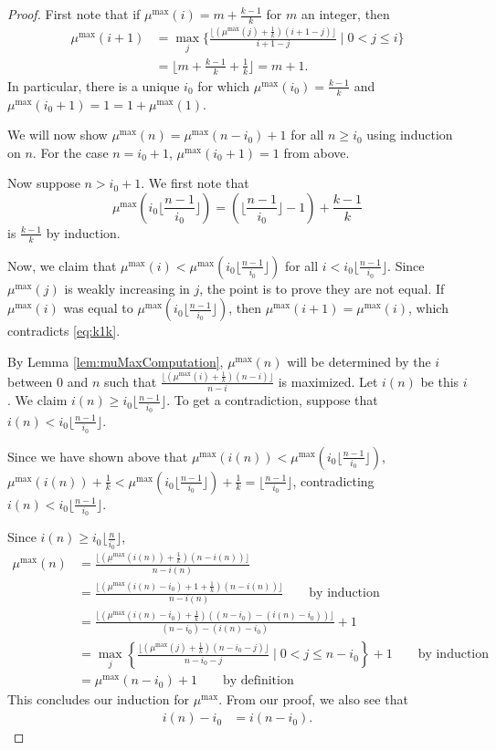 \documentclass[11pt,reqno]{amsart}
\theoremstyle{plain}
\theoremstyle{definition}
\theoremstyle{remark}
\numberwithin{equation}{section}
\numberwithin{equation}{section}
\begin{document}
\begin{proof}
First note that if $\mu^{\max}(i)=m+\frac{k-1}{k}$ for $m$ an integer, then
\begin{align}
\label{eq:k1k}
    \mu^{\max}(i+1)&=\max_j \{\frac{\lfloor(\mu^{\max}(j)+\frac{1}{k})(i+1-j)\rfloor}{i+1-j}\mid 0<j\leq i\}\\
    &= \lfloor m+\frac{k-1}{k}+\frac{1}{k}\rfloor = m+1.
\end{align}
In particular, there is a unique $i_0$ for which $\mu^{\max}(i_0)=\frac{k-1}{k}$ and $\mu^{\max}(i_0+1)=1=1+\mu^{\max}(1)$.

We will now show $\mu^{\max}(n) = \mu^{\max}(n-i_0) + 1$ for all $n\geq i_0$ using induction on $n$. For the case $n=i_0+1$, $\mu^{\max}(i_0+1)=1$ from above.

Now suppose $n>i_0+1$.  We first note that $$\mu^{\max}(i_0 \lfloor \frac{n-1}{i_0}\rfloor)=(\lfloor\frac{n-1}{i_0}\rfloor-1)+\frac{k-1}{k}$$ is $\frac{k-1}{k}$ by induction.

Now, we claim that $\mu^{\max}(i)<\mu^{\max}(i_0 \lfloor \frac{n-1}{i_0}\rfloor)$ for all $i<i_0 \lfloor \frac{n-1}{i_0}\rfloor$. Since $\mu^{\max}(j)$ is weakly increasing in $j$, the point is to prove they are not equal. If $\mu^{\max}(i)$ was equal to $\mu^{\max}(i_0 \lfloor \frac{n-1}{i_0}\rfloor)$, then $\mu^{\max}(i+1)= \mu^{\max}(i)$, which contradicts \eqref{eq:k1k}.

By Lemma \ref{lem:muMaxComputation}, $\mu^{\max}(n)$ will be determined by the $i$ between $0$ and $n$ such that $\frac{\lfloor(\mu^{\max}(i)+\frac{1}{k})(n-i)\rfloor}{n-i}$ is maximized. Let $i(n)$ be this $i$. We claim $i(n) \geq i_0\lfloor \frac{n-1}{i_0}\rfloor$. To get a contradiction, suppose that $i(n) <i_0 \lfloor \frac{n-1}{i_0}\rfloor$.

Since we have shown above that $\mu^{\max}(i(n))<\mu^{\max}(i_0 \lfloor \frac{n-1}{i_0} \rfloor)$, $\mu^{\max}(i(n))+\frac{1}{k}< \mu^{\max}(i_0 \lfloor \frac{n-1}{i_0} \rfloor)+\frac{1}{k}=\lfloor \frac{n-1}{i_0}\rfloor$, contradicting $i(n) <i_0 \lfloor \frac{n-1}{i_0}\rfloor$.

Since $i(n) \geq i_0\lfloor \frac{n}{i_0}\rfloor$,
\begin{align*}
   \mu^{\max}(n) &=  \frac{\lfloor(\mu^{\max}(i(n))+\frac{1}{k})(n-i(n))\rfloor}{n-i(n)}\\
   &= \frac{\lfloor(\mu^{\max}(i(n)-i_0)+1+\frac{1}{k})(n-i(n))\rfloor}{n-i(n)}\qquad\text{by induction}\\
    &= \frac{\lfloor(\mu^{\max}(i(n)-i_0)+\frac{1}{k})((n-i_0)-(i(n)-i_0))\rfloor}{(n-i_0)-(i(n)-i_0)}+1\\
    &= \max_j \left\{\frac{\lfloor(\mu^{\max}(j)+\frac{1}{k})(n-i_0-j)\rfloor}{n-i_0-j}\mid 0<j\leq n-i_0\right\}+1\qquad\text{by induction}\\
   &= \mu^{\max}(n-i_0)+1\qquad\text{by definition}
\end{align*}
This concludes our induction for $\mu^{\max}$. From our proof, we also see that
\begin{align}
\label{eq:i(n)}
    i(n)-i_0 &= i(n-i_0).
\end{align}


\end{proof}
\end{document}
